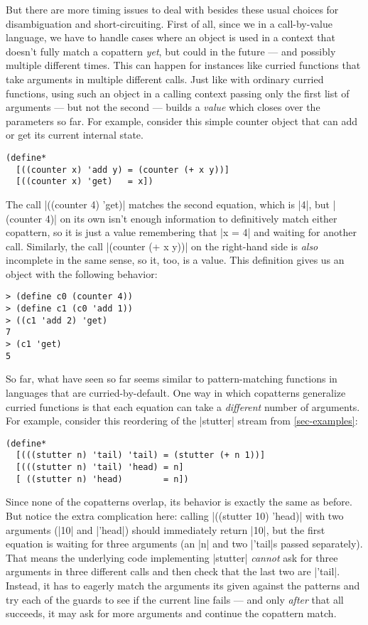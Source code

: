 But there are more timing issues to deal with besides these usual choices for disambiguation and short-circuiting.
First of all, since we in a call-by-value language, we have to handle cases where an object is used in a context that doesn't fully match a copattern \emph{yet}, but could in the future --- and possibly multiple different times.
This can happen for instances like curried functions that take arguments in multiple different calls.
Just like with ordinary curried functions, using such an object in a calling context passing only the first list of arguments --- but not the second --- builds a \emph{value} which closes over the parameters so far.
For example, consider this simple counter object that can add or get its current internal state.
\begin{verbatim}
(define*
  [((counter x) 'add y) = (counter (+ x y))]
  [((counter x) 'get)   = x])
\end{verbatim}
The call \scm|((counter 4) 'get)| matches the second equation, which is \scm|4|, but \scm|(counter 4)| on its own isn't enough information to definitively match either copattern, so it is just a value remembering that \scm|x = 4| and waiting for another call.
Similarly, the call \scm|(counter (+ x y))| on the right-hand side is \emph{also} incomplete in the same sense, so it, too, is a value.
This definition gives us an object with the following behavior:
\begin{verbatim}
> (define c0 (counter 4))
> (define c1 (c0 'add 1))
> ((c1 'add 2) 'get)
7
> (c1 'get)
5
\end{verbatim}

So far, what have seen so far seems similar to pattern-matching functions in languages that are curried-by-default.
One way in which copatterns generalize curried functions is that each equation can take a \emph{different} number of arguments.
For example, consider this reordering of the \scm|stutter| stream from \cref{sec-examples}:
\begin{verbatim}
(define*
  [(((stutter n) 'tail) 'tail) = (stutter (+ n 1))]
  [(((stutter n) 'tail) 'head) = n]
  [ ((stutter n) 'head)        = n])
\end{verbatim}
Since none of the copatterns overlap, its behavior is exactly the same as before.
But notice the extra complication here: calling \scm|((stutter 10) 'head)| with two arguments (\scm|10| and \scm|'head|) should immediately return \scm|10|, but the first equation is waiting for three arguments (an \scm|n| and two \scm|'tail|s passed separately).
That means the underlying code implementing \scm|stutter| \emph{cannot} ask for three arguments in three different calls and then check that the last two are \scm|'tail|.
Instead, it has to eagerly match the arguments its given against the patterns and try each of the guards to see if the current line fails --- and only \emph{after} that all succeeds, it may ask for more arguments and continue the copattern match.

